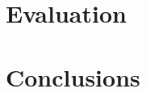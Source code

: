 \documentclass[sigconf, nonacm]{acmart}
\begin{document}
\section{Evaluation}
\label{sec:evaluation}


\section{Conclusions}
\label{sec:conclusions}






\end{document}
